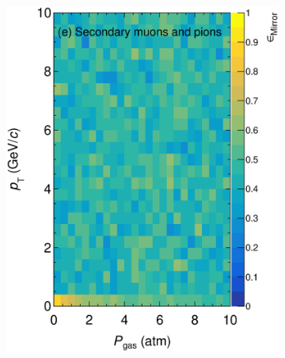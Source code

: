 \begin{figure}[!ht]
\begin{subfigure}[b]{0.32\textwidth}
         \includegraphics[width=\textwidth]{figures/ch5-KF_NDGAr/ToySample/ParScan/testTPCMirrorMirrorRatioVSpTVSdens_sec_mupi.eps}
         \caption{}
         \label{fig:MirrorRatio_Sec_mu}
     \end{subfigure}
          \begin{subfigure}[b]{0.32\textwidth}
         \centering

\end{subfigure}
\end{figure}
